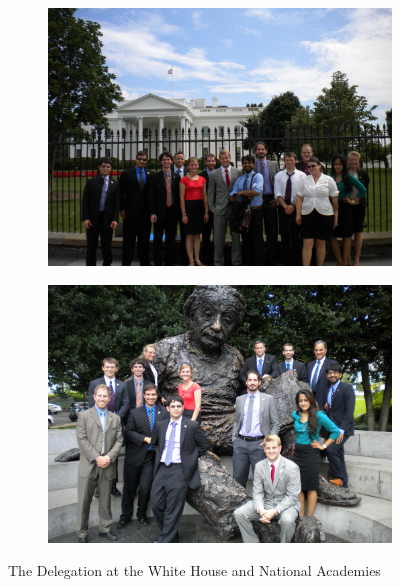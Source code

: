 \begin{figure}[h!]
\centering
\begin{subfigure}{.5 \textwidth}
  \centering
  \includegraphics[width=.95 \linewidth]{NESD_WH.jpg}
  \label{fig:whitehouse}
\end{subfigure}%
\begin{subfigure}{.5\textwidth}
  \centering
  \includegraphics[width=.95 \linewidth]{NESD_Ein.jpg}
  \label{fig:einstein}
\end{subfigure}
\caption{The Delegation at the White House and National Academies}
\label{fig:test}
\end{figure}
